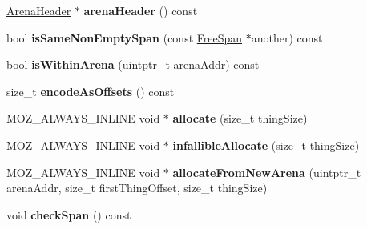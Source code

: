 \begin{DoxyCompactItemize}
\item 
\hypertarget{structjs_1_1gc_1_1_free_span_ad13f966786a54e3bac8fc79e075a3156}{\hyperlink{structjs_1_1gc_1_1_arena_header}{Arena\-Header} $\ast$ {\bfseries arena\-Header} () const }\label{structjs_1_1gc_1_1_free_span_ad13f966786a54e3bac8fc79e075a3156}

\item 
\hypertarget{structjs_1_1gc_1_1_free_span_ac6dc9952fdd856219bbe93c4a4d3386b}{bool {\bfseries is\-Same\-Non\-Empty\-Span} (const \hyperlink{structjs_1_1gc_1_1_free_span}{Free\-Span} $\ast$another) const }\label{structjs_1_1gc_1_1_free_span_ac6dc9952fdd856219bbe93c4a4d3386b}

\item 
\hypertarget{structjs_1_1gc_1_1_free_span_a4533af044d5d42385421140e5e96f251}{bool {\bfseries is\-Within\-Arena} (uintptr\-\_\-t arena\-Addr) const }\label{structjs_1_1gc_1_1_free_span_a4533af044d5d42385421140e5e96f251}

\item 
\hypertarget{structjs_1_1gc_1_1_free_span_abf5e1a69051aa04a4392dac5a7c8e684}{size\-\_\-t {\bfseries encode\-As\-Offsets} () const }\label{structjs_1_1gc_1_1_free_span_abf5e1a69051aa04a4392dac5a7c8e684}

\item 
\hypertarget{structjs_1_1gc_1_1_free_span_a261a76556a4b2f74d549385e7ed0c175}{M\-O\-Z\-\_\-\-A\-L\-W\-A\-Y\-S\-\_\-\-I\-N\-L\-I\-N\-E void $\ast$ {\bfseries allocate} (size\-\_\-t thing\-Size)}\label{structjs_1_1gc_1_1_free_span_a261a76556a4b2f74d549385e7ed0c175}

\item 
\hypertarget{structjs_1_1gc_1_1_free_span_a32bf8a5cec67f6c4a0bb4d9aba1a2dee}{M\-O\-Z\-\_\-\-A\-L\-W\-A\-Y\-S\-\_\-\-I\-N\-L\-I\-N\-E void $\ast$ {\bfseries infallible\-Allocate} (size\-\_\-t thing\-Size)}\label{structjs_1_1gc_1_1_free_span_a32bf8a5cec67f6c4a0bb4d9aba1a2dee}

\item 
\hypertarget{structjs_1_1gc_1_1_free_span_a042819545b290443454e638d06a9c720}{M\-O\-Z\-\_\-\-A\-L\-W\-A\-Y\-S\-\_\-\-I\-N\-L\-I\-N\-E void $\ast$ {\bfseries allocate\-From\-New\-Arena} (uintptr\-\_\-t arena\-Addr, size\-\_\-t first\-Thing\-Offset, size\-\_\-t thing\-Size)}\label{structjs_1_1gc_1_1_free_span_a042819545b290443454e638d06a9c720}

\item 
\hypertarget{structjs_1_1gc_1_1_free_span_acd7fdc7281e2a0be124c12e3779d1977}{void {\bfseries check\-Span} () const }\label{structjs_1_1gc_1_1_free_span_acd7fdc7281e2a0be124c12e3779d1977}

\end{DoxyCompactItemize}
